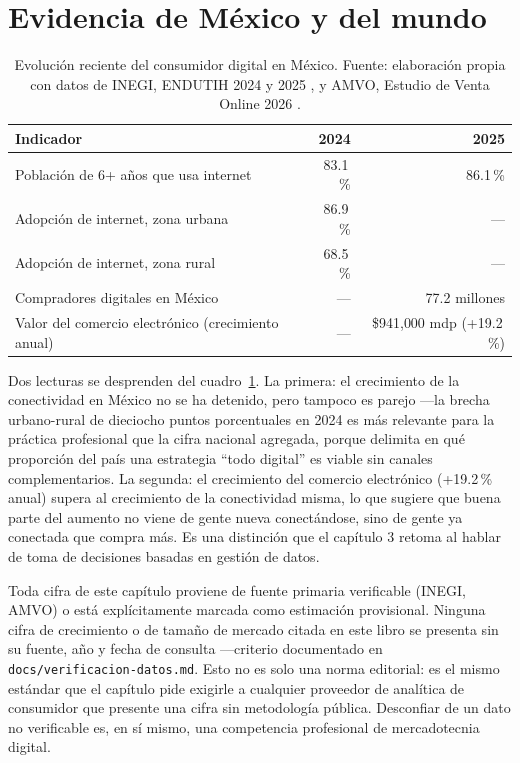 \section{Evidencia de México y del mundo}
\label{sec:cap01-evidencia}

\begin{table}[htbp]
\centering
\begin{tabular}{@{}lrr@{}}
\toprule
Indicador & 2024 & 2025 \\
\midrule
Población de 6+ años que usa internet & 83.1\,\% & 86.1\,\% \\
Adopción de internet, zona urbana & 86.9\,\% & — \\
Adopción de internet, zona rural & 68.5\,\% & — \\
Compradores digitales en México & — & 77.2 millones \\
Valor del comercio electrónico (crecimiento anual) & — & \$941{,}000 mdp (+19.2\,\%) \\
\bottomrule
\end{tabular}
\caption{Evolución reciente del consumidor digital en México. Fuente:
elaboración propia con datos de INEGI, ENDUTIH 2024 y 2025
\parencite{inegi2025endutih,inegi2026endutih}, y AMVO, Estudio de Venta
Online 2026 \parencite{amvo2026}.}
\label{tab:cap01-evidencia}
\end{table}

Dos lecturas se desprenden del cuadro~\ref{tab:cap01-evidencia}. La primera:
el crecimiento de la conectividad en México no se ha detenido, pero tampoco
es parejo —la brecha urbano-rural de dieciocho puntos porcentuales en 2024 es
más relevante para la práctica profesional que la cifra nacional agregada,
porque delimita en qué proporción del país una estrategia \enquote{todo digital} es
viable sin canales complementarios. La segunda: el crecimiento del comercio
electrónico (+19.2\,\% anual) supera al crecimiento de la conectividad
misma, lo que sugiere que buena parte del aumento no viene de gente nueva
conectándose, sino de gente ya conectada que compra más. Es una distinción
que el capítulo 3 retoma al hablar de toma de decisiones basadas en gestión
de datos.

\begin{cajaEtica}
Toda cifra de este capítulo proviene de fuente primaria verificable (INEGI,
AMVO) o está explícitamente marcada como estimación provisional. Ninguna
cifra de crecimiento o de tamaño de mercado citada en este libro se presenta
sin su fuente, año y fecha de consulta —criterio documentado en
\texttt{docs/verificacion-datos.md}. Esto no es solo una norma editorial:
es el mismo estándar que el capítulo pide exigirle a cualquier proveedor de
analítica de consumidor que presente una cifra sin metodología pública.
Desconfiar de un dato no verificable es, en sí mismo, una competencia
profesional de mercadotecnia digital.
\end{cajaEtica}

